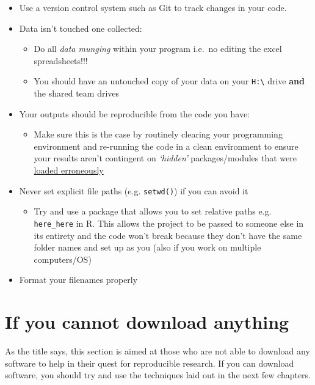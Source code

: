 \documentclass[]{book}
\providecommand{\tightlist}{%
  \setlength{\itemsep}{0pt}\setlength{\parskip}{0pt}}
\begin{document}
\begin{itemize}
\tightlist
\item
  Use a version control system such as Git to track changes in your code.
\item
  Data isn't touched one collected:

  \begin{itemize}
  \tightlist
  \item
    Do all \emph{data munging} within your program i.e.~no editing the excel spreadsheets!!!
  \item
    You should have an untouched copy of your data on your \texttt{H:\textbackslash{}} drive \textbf{and} the shared team drives
  \end{itemize}
\item
  Your outputs should be reproducible from the code you have:

  \begin{itemize}
  \tightlist
  \item
    Make sure this is the case by routinely clearing your programming environment and re-running the code in a clean environment to ensure your results aren't contingent on \emph{`hidden'} packages/modules that were \href{https://onunicornsandgenes.blog/2017/04/02/using-r-dont-save-your-workspace/}{loaded erroneously}
  \end{itemize}
\item
  Never set explicit file paths (e.g. \texttt{setwd()}) if you can avoid it

  \begin{itemize}
  \tightlist
  \item
    Try and use a package that allows you to set relative paths e.g. \texttt{here\_here} in R. This allows the project to be passed to someone else in its entirety and the code won't break because they don't have the same folder names and set up as you (also if you work on multiple computers/OS)
  \end{itemize}
\item
  Format your filenames properly
\end{itemize}

\hypertarget{if-you-cannot-download-anything}{%
\chapter{If you cannot download anything}\label{if-you-cannot-download-anything}}

As the title says, this section is aimed at those who are not able to download any software to help in their quest for reproducible research. If you can download software, you should try and use the techniques laid out in the next few chapters.
\end{document}
